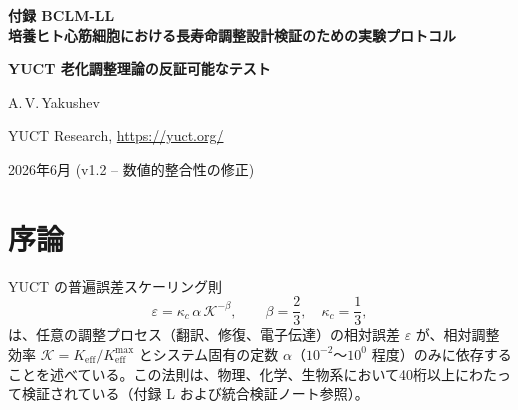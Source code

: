 \documentclass[12pt,a4paper]{ltjsarticle}
\newcommand{\REL}{\mathcal{K}}          %
\begin{document}
	
	\begin{titlepage}
		\centering
		\vspace*{2cm}
		{\Huge\bfseries 付録 BCLM-LL\\[0.3cm]
			培養ヒト心筋細胞における長寿命調整設計検証のための実験プロトコル\par}
		\vspace{0.5cm}
		{\Large\bfseries YUCT 老化調整理論の反証可能なテスト\par}
		\vspace{1.5cm}
		{\large A.\,V.\,Yakushev\par}
		{\normalsize YUCT Research, \url{https://yuct.org/}\par}
		\vspace{1.0cm}
		{\normalsize 2026年6月 (v1.2 – 数値的整合性の修正)}\par
		\vfill
		\begin{abstract}
			\noindent
			Yakushev 統一調整理論 (YUCT) は、老化を細胞サブシステムの調整効率 \(K_{\mathrm{eff}}\) の進行性低下として説明する。生物調整ラグランジアン (BCLM, 付録 BCLM) は、配列データから \(K_{\mathrm{eff}}\) を計算し、それを幼若レベルに回復させる遺伝的介入を設計するための数学的枠組みを提供する。本プロトコルは、培養ヒト心筋細胞において長寿命調整設計を検証するための完全で自己完結的な実験を記述する。操作すべき正確な遺伝子を特定し、それらの天然型および最適化型の相対調整効率 \(\REL\) を計算し、普遍誤差則 \(\varepsilon = \kappa_c \alpha \REL^{-\beta}\) (\(\beta=2/3\), \(\kappa_c=1/3\)) から突然変異率、酸化ストレス、タンパク質凝集、遊走速度、細胞寿命の定量的予測を直接導出し、段階的な実験スケジュールを提供する。老化表現型の可逆性を示すために制御回帰モジュール (CCR) も含まれる。すべての予測は事前登録されており、標準的な細胞生物学アッセイで反証可能である。倫理的理由により、プロトコルは \textit{in vivo} 送達法を意図的に省略している。読者は付録~\(\Sigma\) を参照されたい。
		\end{abstract}
	\end{titlepage}
	
	\tableofcontents
	\newpage
	
	\section{序論}
	\label{sec:intro}
	YUCT の普遍誤差スケーリング則
	\begin{equation}
		\varepsilon = \kappa_c \, \alpha \, \REL^{-\beta}, \qquad \beta = \frac{2}{3},\quad \kappa_c = \frac{1}{3},
		\label{eq:error-law}
	\end{equation}
	は、任意の調整プロセス（翻訳、修復、電子伝達）の相対誤差 \(\varepsilon\) が、相対調整効率 \(\REL = K_{\mathrm{eff}}/K_{\mathrm{eff}}^{\max}\) とシステム固有の定数 \(\alpha\)（\(10^{-2}\)～\(10^{0}\) 程度）のみに依存することを述べている。この法則は、物理、化学、生物系において40桁以上にわたって検証されている（付録 L および統合検証ノート参照）。
	
\end{document}
